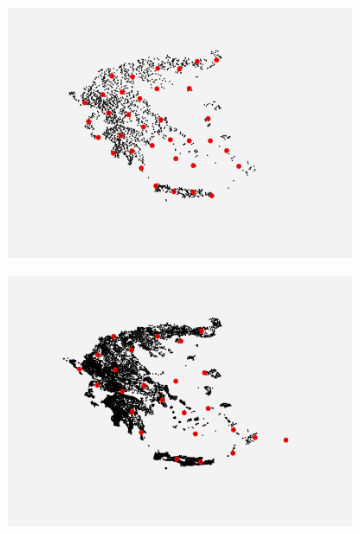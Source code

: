 \begin{figure}[!h] 
  \centering
  \begin{subfigure}[b]{0.45\linewidth}
    \centering
    \includegraphics[width=0.9\linewidth]{Pictures/rs_greece} 
    \label{fig:ls_greece} 
  \end{subfigure}%
  \begin{subfigure}[b]{0.45\linewidth}
    \centering
    \includegraphics[width=0.9\linewidth]{Pictures/ls_greece} 
    \label{fig:rs_greece} 
  \end{subfigure}
  \label{fig:ls_rs_greece} 
\end{figure}


